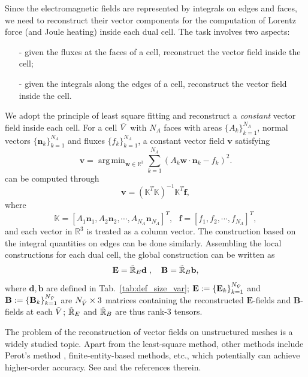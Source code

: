 \documentclass{article}
\DeclareMathOperator*{\argmin}{arg\,min}
\begin{document}
Since the electromagnetic fields are represented by integrals on edges and faces, we need
to reconstruct their vector components for the computation of Lorentz force (and Joule
heating) inside each dual cell. The task involves two aspects:
\begin{itemize}
    \item[-] given the fluxes at the faces of a cell, reconstruct the vector field inside the cell;
    \item[-] given the integrals along the edges of a cell, reconstruct the vector field inside the cell. 
\end{itemize}
We adopt the principle of least square fitting and reconstruct a \emph{constant} vector
field inside each cell. For a cell $\Tilde{V}$ with $N_A$ faces with areas
$\{A_k\}_{k=1}^{N_A}$, normal vectors $\{\mathbf{n}_k\}_{k=1}^{N_A}$ and fluxes
$\{f_k\}_{k=1}^{N_A}$, a constant vector field $\mathbf{v}$ satisfying
\begin{equation*}
    \mathbf{v} = \argmin_{\mathbf{w}\in \mathbb{R}^3} \sum_{k=1}^{N_A}(A_k\mathbf{w} \cdot \mathbf{n}_k - f_k)^2.   
\end{equation*} can be computed through
\begin{equation*}
    \mathbf{v} = (\mathbb{K}^T\mathbb{K})^{-1}\mathbb{K}^T\mathbf{f},
\end{equation*}
where
\begin{equation*}
    \mathbb{K} = [A_1\mathbf{n}_1, A_2\mathbf{n}_2, \cdots, A_{N_A}\mathbf{n}_{N_A}]^T,\ \ \ \mathbf{f} = [f_1, f_2, \cdots, f_{N_A}]^T,
\end{equation*}
and each vector in $\mathbb{R}^3$ is treated as a column vector. The construction based on
the integral quantities on edges can be done similarly. Assembling the local constructions
for each dual cell, the global construction can be written as
\begin{equation}
    \mathbf{E} = \Tilde{\mathbb{R}}_E\mathbf{d}\;,
    \quad
    \mathbf{B} = \Tilde{\mathbb{R}}_B\mathbf{b},
    \label{equ:reconstruction}
\end{equation}
where $\mathbf{d}, \mathbf{b}$ are defined in Tab.~\ref{tab:def_size_var};
$\mathbf{E} := \{\mathbf{E}_k\}_{k=1}^{N_{\Tilde{V}}}$ and
$\mathbf{B} := \{\mathbf{B}_k\}_{k=1}^{N_{\Tilde{V}}}$ are $N_{\Tilde{V}} \times 3$
matrices containing the reconstructed $\mathbf{E}$-fields and $\mathbf{B}$-fields at each
$\Tilde{V}$; $\Tilde{\mathbb{R}}_E$ and $\Tilde{\mathbb{R}}_B$ are thus rank-3 tensors.

The problem of the reconstruction of vector fields on unstructured meshes is a widely
studied topic. Apart from the least-square method, other methods include Perot's method
\citep{perot_2000}, finite-entity-based methods, etc., which potentially can achieve
higher-order accuracy. See \cite[][Sec. 3.4.4]{fuchs_2021} and the references therein.
\end{document}
